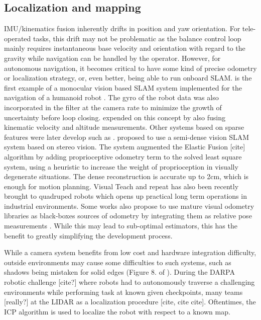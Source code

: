 \subsection{Localization and mapping}
IMU/kinematics fusion inherently drifts in position and yaw orientation. For tele-operated tasks, this drift may not be problematic as the balance control loop
mainly requires instantaneous base velocity and orientation with regard to the gravity while navigation can be handled by the operator. However, for autonomous
navigation, it becomes critical to have some kind of precise odometry or localization strategy, or, even better, being able to run onboard SLAM. 
\cite{davison2007monoslam} is the first example of a monocular vision based SLAM system implemented for the navigation of a humanoid robot . The gyro of the robot data
was also incorporated in the filter at the camera rate to minimize the growth of uncertainty before loop closing. \cite{stasse2006real} expended on this concept by also fusing
kinematic velocity and altitude measurements. Other systems based on sparse features were later develop such as \cite{ahn2012board, oriolo2012vision, oriolo2016humanoid, kwak20093d}.
\cite{scona2017direct} proposed to use a semi-dense vision SLAM system based on stereo vision. The system augmented the Elastic Fusion [cite] algorithm by adding 
proprioceptive odometry term to the solved least square system, using a heuristic to increase the weight of proprioception in visually degenerate situations. The 
dense reconstruction is accurate up to 2cm, which is enough for motion planning. Visual Teach and repeat \cite{furgale2010visual} has also been recently brought to quadruped 
robots \cite{mattamala2021learning} which opens up practical long term operations in industrial environments. Some works also propose to use mature visual odometry libraries
as black-boxes sources of odometry by integrating them as relative pose measurements \cite{hartley2018legged,hartley2018hybrid}. While this may lead to sub-optimal estimators, 
this has the benefit to greatly simplifying the development process.

While a camera system benefits from low cost and hardware integration difficulty, outside environments 
may cause some difficulties to such systems, such as shadows being mistaken for solid edges (Figure 8. of \cite{fallon2014drift}).
During the DARPA robotic challenge [cite?] where robots had to autonomously traverse a challenging environments while performing task at known given checkpoints, 
many teams [really?] at the LIDAR as a localization procedure [cite, cite cite]. Oftentimes, the ICP algorithm is used to localize the robot 
with respect to a known map.

